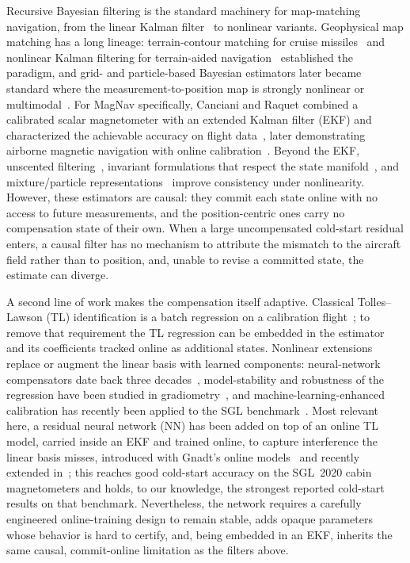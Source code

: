 \documentclass{IEEEtaes}
\begin{document}
Recursive Bayesian filtering is the standard machinery for map-matching
navigation, from the linear Kalman filter~\cite{kalman1960} to nonlinear variants.
Geophysical map matching has a long lineage: terrain-contour matching for cruise
missiles~\cite{golden1980} and nonlinear Kalman filtering for terrain-aided
navigation~\cite{hostetler1983} established the paradigm, and grid- and
particle-based Bayesian estimators later became standard where the
measurement-to-position map is strongly nonlinear or
multimodal~\cite{bergman1999,gustafsson2002,anonsen2006,nordlund2009}. For MagNav
specifically, Canciani and Raquet combined a calibrated scalar magnetometer with an
extended Kalman filter (EKF) and characterized the achievable accuracy on flight
data~\cite{canciani2016,canciani2017}, later demonstrating airborne magnetic
navigation with online calibration~\cite{canciani2020}. Beyond the EKF, unscented
filtering~\cite{julier2004}, invariant formulations that respect the state
manifold~\cite{barrau2017}, and mixture/particle representations~\cite{barshalom2001}
improve consistency under nonlinearity. However, these estimators are causal:
they commit each state online with no access to future measurements, and the
position-centric ones carry no compensation state of their own. When a large
uncompensated cold-start residual enters, a causal filter has no mechanism to
attribute the mismatch to the aircraft field rather than to position, and, unable to
revise a committed state, the estimate can diverge.

A second line of work makes the compensation itself adaptive. Classical
Tolles--Lawson (TL) identification is a batch regression on a calibration
flight~\cite{tolles1950,leliak1961,bickel1979}; to remove that requirement the TL
regression can be embedded in the estimator and its coefficients tracked online as
additional states. Nonlinear extensions replace or augment the linear basis with
learned components: neural-network compensators date back three
decades~\cite{williams1993}, model-stability and robustness of the regression have
been studied in gradiometry~\cite{noriega2015}, and machine-learning-enhanced
calibration has recently been applied to the SGL benchmark~\cite{gnadt2022}. Most
relevant here, a residual neural network (NN) has been added on top of an online TL
model, carried inside an EKF and trained online, to capture interference the linear
basis misses, introduced with Gnadt's online models~\cite{gnadt2022} and recently
extended in~\cite{hager2026}; this reaches good cold-start accuracy on the SGL~2020
cabin magnetometers and holds, to our knowledge, the strongest reported cold-start
results on that benchmark. Nevertheless, the network requires a carefully
engineered online-training design to remain stable, adds opaque parameters whose
behavior is hard to certify, and, being embedded in an EKF, inherits the same
causal, commit-online limitation as the filters above.
\end{document}
